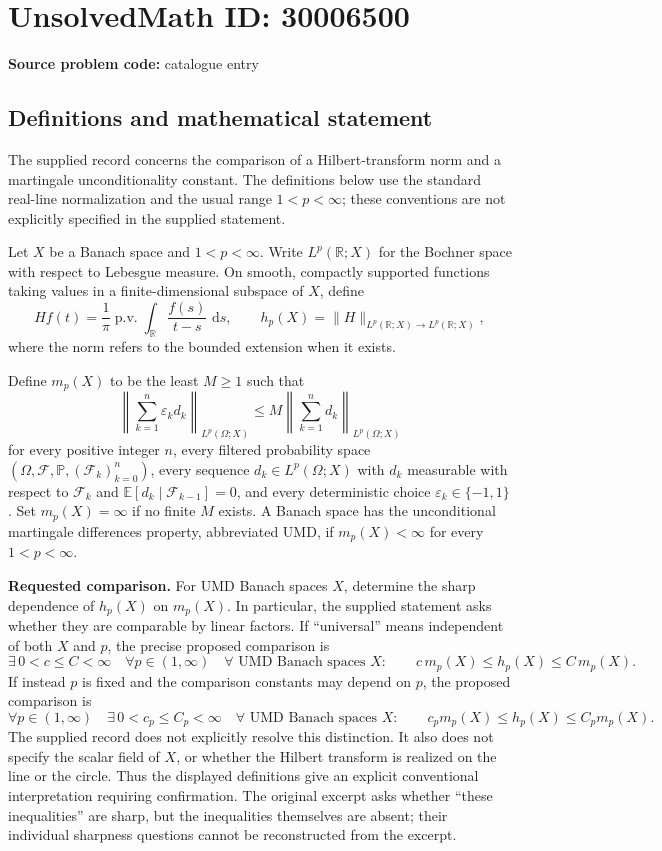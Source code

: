\documentclass[11pt]{article}
\newcommand{\R}{\mathbb{R}}
\newcommand{\dd}{\,\mathrm{d}}
\begin{document}
\section*{UnsolvedMath ID: 30006500}
\textbf{Source problem code:} catalogue entry
\subsection{Definitions and mathematical statement}
The supplied record concerns the comparison of a Hilbert-transform norm and a martingale unconditionality constant. The definitions below use the standard real-line normalization and the usual range \(1<p<\infty\); these conventions are not explicitly specified in the supplied statement.

Let \(X\) be a Banach space and \(1<p<\infty\). Write \(L^p(\R;X)\) for the Bochner space with respect to Lebesgue measure. On smooth, compactly supported functions taking values in a finite-dimensional subspace of \(X\), define
\[
Hf(t)=\frac{1}{\pi}\operatorname{p.v.}\int_{\R}\frac{f(s)}{t-s}\,\dd s,
\qquad
h_p(X)=\|H\|_{L^p(\R;X)\to L^p(\R;X)},
\]
where the norm refers to the bounded extension when it exists.

Define \(m_p(X)\) to be the least \(M\geq 1\) such that
\[
\left\|\sum_{k=1}^{n}\varepsilon_k d_k\right\|_{L^p(\Omega;X)}
\leq M\left\|\sum_{k=1}^{n}d_k\right\|_{L^p(\Omega;X)}
\]
for every positive integer \(n\), every filtered probability space \((\Omega,\mathcal F,\mathbb P,(\mathcal F_k)_{k=0}^{n})\), every sequence \(d_k\in L^p(\Omega;X)\) with \(d_k\) measurable with respect to \(\mathcal F_k\) and \(\mathbb E[d_k\mid\mathcal F_{k-1}]=0\), and every deterministic choice \(\varepsilon_k\in\{-1,1\}\). Set \(m_p(X)=\infty\) if no finite \(M\) exists. A Banach space has the unconditional martingale differences property, abbreviated UMD, if \(m_p(X)<\infty\) for every \(1<p<\infty\).

\textbf{Requested comparison.} For UMD Banach spaces \(X\), determine the sharp dependence of \(h_p(X)\) on \(m_p(X)\). In particular, the supplied statement asks whether they are comparable by linear factors. If ``universal'' means independent of both \(X\) and \(p\), the precise proposed comparison is
\[
\exists\,0<c\leq C<\infty\quad
\forall p\in(1,\infty)\quad
\forall\text{ UMD Banach spaces }X:\qquad
c\,m_p(X)\leq h_p(X)\leq C\,m_p(X).
\]
If instead \(p\) is fixed and the comparison constants may depend on \(p\), the proposed comparison is
\[
\forall p\in(1,\infty)\quad
\exists\,0<c_p\leq C_p<\infty\quad
\forall\text{ UMD Banach spaces }X:\qquad
c_p m_p(X)\leq h_p(X)\leq C_p m_p(X).
\]
The supplied record does not explicitly resolve this distinction. It also does not specify the scalar field of \(X\), or whether the Hilbert transform is realized on the line or the circle. Thus the displayed definitions give an explicit conventional interpretation requiring confirmation. The original excerpt asks whether ``these inequalities'' are sharp, but the inequalities themselves are absent; their individual sharpness questions cannot be reconstructed from the excerpt.
\end{document}

